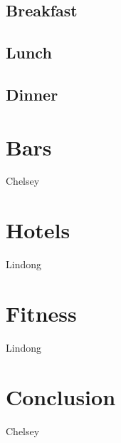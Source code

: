 \documentclass[11pt]{article}
\begin{document}
\subsection{Breakfast}

\subsection{Lunch}

\subsection{Dinner}

\section{Bars}

Chelsey

\section{Hotels}

Lindong

\section{Fitness}

Lindong


\section{Conclusion}


Chelsey
\end{document}
